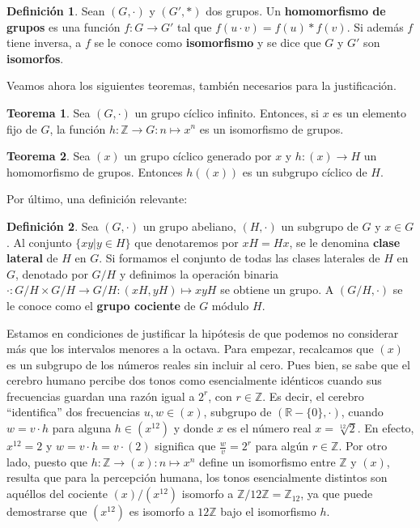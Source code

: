 \documentclass[letterpaper,12pt]{book}
\theoremstyle{definition} \newtheorem{Def}{Definición}[chapter]
\theoremstyle{definition} \newtheorem{Teo}{Teorema}[chapter]
\theoremstyle{definition} \newtheorem{Pro}{Proposición}[chapter]
\theoremstyle{definition} \newtheorem{Lema}{Lema}[chapter]
\begin{document}
\begin{Def}
 Sean $(G,\cdot)$ y $(G',\ast)$ dos grupos. Un \textbf{homomorfismo de grupos} es una función $f:G \to G'$ tal que $f(u \cdot v)=f(u) \ast f(v)$. Si además $f$ tiene inversa, a $f$ se le conoce como \textbf{isomorfismo} y se dice que $G$ y $G'$ son \textbf{isomorfos}.
\end{Def}

Veamos ahora los siguientes teoremas, también necesarios para la justificación.

\begin{Teo} 
Sea $(G,\cdot)$ un grupo cíclico infinito. Entonces, si $x$ es un elemento fijo de $G$, la función $h:\mathbb{Z}\to G:n\mapsto x^n$ es un isomorfismo de grupos.
\end{Teo}

\begin{Teo} 
Sea $(x)$ un grupo cíclico generado por $x$ y $h:(x)\to H$ un homomorfismo de grupos. Entonces $h((x))$ es un subgrupo cíclico de $H$.
\end{Teo}

Por último, una definición relevante:

\begin{Def} 
 Sea $(G,\cdot)$ un grupo abeliano, $(H,\cdot)$ un subgrupo de $G$ y $x \in G$. Al conjunto $\{xy | y \in H\}$ que denotaremos por $xH=Hx$, se le denomina \textbf{clase lateral} de $H$ en $G$. Si formamos el conjunto de todas las clases laterales de $H$ en $G$, denotado por $G/H$ y definimos la operación binaria $\cdot:G/H \times G/H \to G/H:(xH,yH) \mapsto xyH$ se obtiene un grupo. A $(G/H,\cdot)$ se le conoce como el \textbf{grupo cociente} de $G$ módulo $H$.
\end{Def}

 Estamos en condiciones de justificar la hipótesis de que podemos no considerar más que los intervalos menores a la octava. Para empezar, recalcamos que $(x)$ es un subgrupo de los números reales sin incluir al cero. Pues bien, se sabe que el cerebro humano percibe dos tonos como esencialmente idénticos cuando sus frecuencias guardan una razón igual a $2^r$, con $r \in \mathbb{Z}$. Es decir, el cerebro ``identifica'' dos frecuencias $u, w \in (x)$, subgrupo de $(\mathbb{R}-\{0\},\cdot)$, cuando $w=v\cdot h$ para alguna $h \in (x^{12})$ y donde $x$ es el número real $x=\sqrt[12]{2}$. En efecto, $x^{12}=2$ y $w=v\cdot h=v\cdot(2)$ significa que $\frac{w}{v}=2^r$ para algún $r \in \mathbb{Z}$. Por otro lado, puesto que $h:\mathbb{Z} \to (x):n \mapsto x^n$ define un isomorfismo entre $\mathbb{Z}$ y $(x)$, resulta que para la percepción humana, los tonos esencialmente distintos son aquéllos del cociente $(x)/(x^{12})$ isomorfo a  $\mathbb{Z}/12\mathbb{Z}=\mathbb{Z}_{12}$, ya que puede demostrarse que $(x^{12})$ es isomorfo a $12 \mathbb{Z}$ bajo el isomorfismo $h$. 
 
\end{document}
